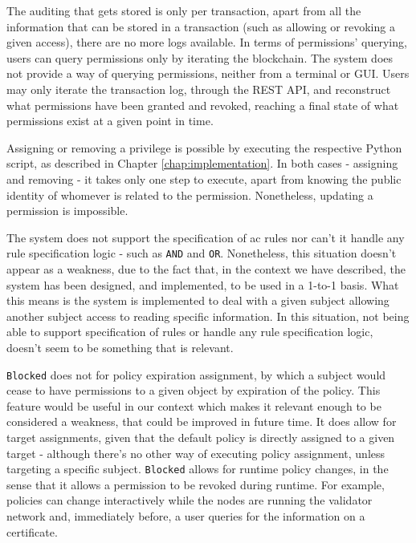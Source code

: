 The auditing that gets stored is only per transaction, apart from all the information that can be stored in a transaction (such as allowing or revoking a given access), there are no more logs available.  In terms of permissions' querying, users can query permissions only by iterating the blockchain. The system does not provide a way of querying permissions, neither from a terminal or GUI. Users may only iterate the transaction log, through the REST API, and reconstruct what permissions have been granted and revoked, reaching a final state of what permissions exist at a given point in time. 

Assigning or removing a privilege is possible by executing the respective Python script, as described in Chapter \ref{chap:implementation}. In both cases - assigning and removing - it takes only one step to execute, apart from knowing the public identity of whomever is related to the permission. Nonetheless, updating a permission is impossible. 

The system does not support the specification of \gls{ac} rules nor can't it handle any rule specification logic - such as \texttt{AND} and \texttt{OR}. Nonetheless, this situation doesn't appear as a weakness, due to the fact that, in the context we have described, the system has been designed, and implemented, to be used in a 1-to-1 basis. What this means is the system is implemented to deal with a given subject allowing another subject access to reading specific information. In this situation, not being able to support specification of rules or handle any rule specification logic, doesn't seem to be something that is relevant.

\texttt{Blocked} does not for policy expiration assignment, by which a subject would cease to have permissions to a given object by expiration of the policy. This feature would be useful in our context which makes it relevant enough to be considered a weakness, that could be improved in future time. It does allow for target assignments, given that the default policy is directly assigned to a given target - although there's no other way of executing policy assignment, unless targeting a specific subject. \texttt{Blocked} allows for runtime policy changes, in the sense that it allows a permission to be revoked during runtime. For example, policies can change interactively while the nodes are running the validator network and, immediately before, a user queries for the information on a certificate. 

